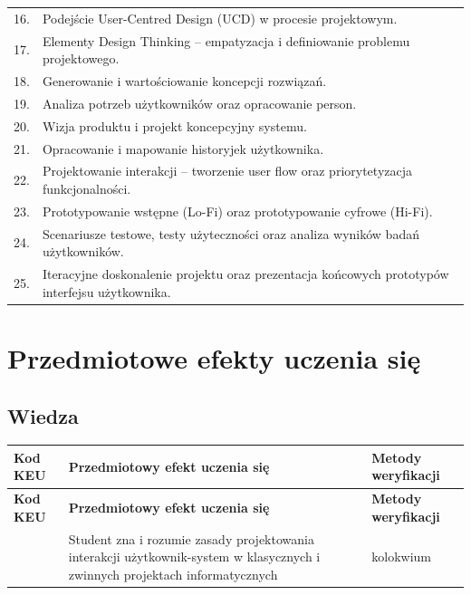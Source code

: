 \documentclass[12pt, a4paper]{article}
\newcommand{\thdrule}{\noalign{\global\setlength{\extrarowheight}{0pt}}}
\newcommand{\thdend}{\noalign{\global\setlength{\extrarowheight}{3pt}}}
\begin{document}
{\begin{longtable}{m{1.5cm}m{14.5cm}}
  \rowcolor{tableRowAlt} 16. & Podejście User-Centred Design (UCD) w procesie projektowym. \\
  \rowcolor{tableRowLight} 17. & Elementy Design Thinking – empatyzacja i definiowanie problemu projektowego. \\
  \rowcolor{tableRowAlt} 18. & Generowanie i wartościowanie koncepcji rozwiązań. \\
  \rowcolor{tableRowLight} 19. & Analiza potrzeb użytkowników oraz opracowanie person. \\
  \rowcolor{tableRowAlt} 20. & Wizja produktu i projekt koncepcyjny systemu. \\
  \rowcolor{tableRowLight} 21. & Opracowanie i mapowanie historyjek użytkownika. \\
  \rowcolor{tableRowAlt} 22. & Projektowanie interakcji – tworzenie user flow oraz priorytetyzacja funkcjonalności. \\
  \rowcolor{tableRowLight} 23. & Prototypowanie wstępne (Lo-Fi) oraz prototypowanie cyfrowe (Hi-Fi). \\
  \rowcolor{tableRowAlt} 24. & Scenariusze testowe, testy użyteczności oraz analiza wyników badań użytkowników. \\
  \rowcolor{tableRowLight} 25. & Iteracyjne doskonalenie projektu oraz prezentacja końcowych prototypów interfejsu użytkownika. \\
\bottomrule
\end{longtable}}

\section{Przedmiotowe efekty uczenia się}

\subsection*{Wiedza}
{\scriptsize
\begin{longtable}{m{1.6cm}m{9.0cm}m{4.2cm}}
\thdrule\toprule
\rowcolor{pjatkRed} {\color{white}\footnotesize\textbf{\vphantom{Ag}Kod KEU}} & {\color{white}\footnotesize\textbf{\vphantom{Ag}Przedmiotowy efekt uczenia się}} & {\color{white}\footnotesize\textbf{\vphantom{Ag}Metody weryfikacji}} \\
\midrule\thdend
\endfirsthead
\thdrule\toprule
\rowcolor{pjatkRed} {\color{white}\footnotesize\textbf{\vphantom{Ag}Kod KEU}} & {\color{white}\footnotesize\textbf{\vphantom{Ag}Przedmiotowy efekt uczenia się}} & {\color{white}\footnotesize\textbf{\vphantom{Ag}Metody weryfikacji}} \\
\midrule\thdend
\endhead
  \rowcolor{tableRowLight}  & Student zna i rozumie zasady projektowania interakcji użytkownik-system w klasycznych i zwinnych projektach informatycznych & kolokwium \\
\bottomrule
\end{longtable}}
\end{document}
